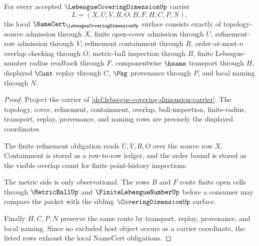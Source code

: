 \begin{theorem}
\label{thm:lebesgue-covering-dimension-namecert-obligations}
For every accepted $\LebesgueCoveringDimensionUp$ carrier
$$
L=(X,U,V,R,O,B,F,H,C,P,N),
$$
the local $\NameCert_{\LebesgueCoveringDimensionUp}$ surface consists exactly
of topology-source admission through $X$, finite open-cover admission through
$U$, refinement-row admission through $V$, refinement containment through $R$,
order-at-most-$n$ overlap checking through $O$, metric-ball inspection through
$B$, finite Lebesgue-number radius readback through $F$, componentwise
$\hsame$ transport through $H$, displayed $\Cont$ replay through $C$,
$\Pkg$ provenance through $P$, and local naming through $N$.
\end{theorem}
\begin{proof}
Project the carrier of
\autoref{def:lebesgue-covering-dimension-carrier}. The topology, cover,
refinement, containment, overlap, ball-inspection, finite-radius, transport,
replay, provenance, and naming rows are precisely the displayed coordinates.

The finite refinement obligation reads $U,V,R,O$ over the source row $X$.
Containment is stored as a row-to-row ledger, and the order bound is stored as
the visible overlap count for finite point-history inspections.

The metric side is only observational. The rows $B$ and $F$ route finite open
cells through $\MetricBallUp$ and $\FiniteLebesgueNumberUp$ before a consumer
may compare the packet with the sibling $\CoveringDimensionUp$ surface.

Finally $H,C,P,N$ preserve the same route by transport, replay, provenance,
and local naming. Since no excluded host object occurs as a carrier coordinate,
the listed rows exhaust the local NameCert obligations.
\end{proof}


